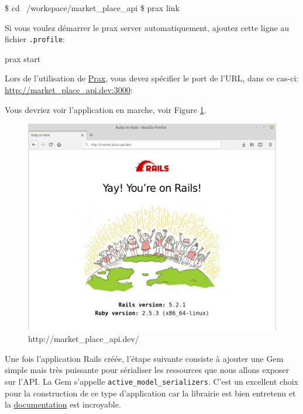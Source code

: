 \documentclass[]{report}
\begin{document}
        \begin{bashcode}
        \$ cd ~/workspace/market_place_api
        \$ prax link
        \end{bashcode}

        Si vous voulez démarrer le prax server automatiquement, ajoutez cette ligne au fichier \verb|.profile|:

        \begin{bashcode}
        prax start
        \end{bashcode}

        Lors de l'utilisation de \href{https://github.com/ysbaddaden/prax.cr}{Prax}, vous devez spécifier le port de l'URL, dans ce cas-ci: \href{http://market_place_api.dev:3000/}{http://market\_place\_api.dev:3000}:

        Vous devriez voir l'application en marche, voir Figure \ref{fig:pow_running}.

        \begin{figure}
          \includegraphics[width=\linewidth]{img/pow_running.png}
          \caption{http://market\_place\_api.dev/}
          \label{fig:pow_running}
        \end{figure}

        Une fois l'application Rails créée, l'étape suivante consiste à ajouter une Gem simple mais très puissante pour sérialiser les ressources que nous allons exposer sur l'API. La Gem s'appelle \verb|active_model_serializers|. C'est un excellent choix pour la construction de ce type d'application car la librairie est bien entretenu et la \href{https://github.com/rails-api/active_model_serializers}{documentation} est incroyable.
\end{document}
